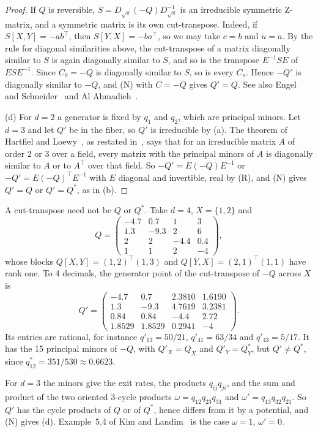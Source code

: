 \begin{proof}
If $Q$ is reversible, $S=D_{\sqrt\pi}(-Q)D_{\sqrt\pi}^{-1}$ is an irreducible symmetric
Z-matrix, and a symmetric matrix is its own cut-transpose. Indeed, if $S[X,Y]=-ab^\top$, then
$S[Y,X]=-ba^\top$, so we may take $c=b$ and $u=a$. By the rule for diagonal similarities
above, the cut-transpose of a matrix diagonally similar to $S$ is again diagonally similar
to $S$, and so is the transpose $E^{-1}SE$ of $ESE^{-1}$. Since $C_0=-Q$ is diagonally similar
to $S$, so is every $C_s$. Hence $-Q'$ is diagonally similar to $-Q$, and (N) with $C=-Q$
gives $Q'=Q$. See also Engel and Schneider~\cite[Theorem~3.5]{engelschneider1980} and Al
Ahmadieh~\cite[Lemma~6.1 and Theorem~6.2]{alahmadieh2023}.

(d) For $d=2$ a generator is fixed by $q_1$ and $q_2$, which are principal minors. Let
$d=3$ and let $Q'$ be in the fiber, so $Q'$ is irreducible by (a). The theorem of Hartfiel
and Loewy~\cite[Theorem~3]{hartfielloewy1984}, as restated in~\cite[Lemma~2.8]{cggr2024},
says that for an irreducible matrix $A$ of order $2$ or $3$ over a field, every matrix with
the principal minors of $A$ is diagonally similar to $A$ or to $A^\top$ over that field. So
$-Q'=E(-Q)E^{-1}$ or $-Q'=E(-Q)^\top E^{-1}$ with $E$ diagonal and invertible, real by (R),
and (N) gives $Q'=Q$ or $Q'=Q^*$, as in (b).
\end{proof}

A cut-transpose need not be $Q$ or $Q^*$. Take $d=4$, $X=\{1,2\}$ and
\[
 Q=\begin{pmatrix}-4.7&0.7&1&3\\1.3&-9.3&2&6\\2&2&-4.4&0.4\\1&1&2&-4\end{pmatrix},
\]
whose blocks $Q[X,Y]=(1,2)^\top(1,3)$ and $Q[Y,X]=(2,1)^\top(1,1)$ have rank one. To 4
decimals, the generator point of the cut-transpose of $-Q$ across $X$ is
\[
 Q'=\begin{pmatrix}-4.7&0.7&2.3810&1.6190\\1.3&-9.3&4.7619&3.2381\\
 0.84&0.84&-4.4&2.72\\1.8529&1.8529&0.2941&-4\end{pmatrix}.
\]
Its entries are rational, for instance $q'_{13}=50/21$, $q'_{41}=63/34$ and
$q'_{43}=5/17$. It has the 15 principal minors of $-Q$, with $Q'_X=Q_X$ and
$Q'_Y=Q^*_Y$, but $Q'\ne Q^*$, since $q^*_{12}=351/530\approx0.6623$.

\begin{remark}\label{rem:three-states}
For $d=3$ the minors give the exit rates, the products $q_{ij}q_{ji}$, and the sum and
product of the two oriented $3$-cycle products $\omega=q_{12}q_{23}q_{31}$ and
$\omega'=q_{13}q_{32}q_{21}$. So $Q'$ has the cycle products of $Q$ or of $Q^*$, hence differs
from it by a potential, and (N) gives (d). Example~5.4 of Kim and Landim~\cite{kl2024} is the
case $\omega=1$, $\omega'=0$.
\end{remark}

